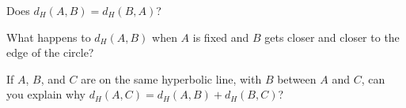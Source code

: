 \begin{prob}
Does $d_H(A,B) = d_H(B,A)$?
\end{prob}

\begin{prob}
What happens to $d_H(A,B)$ when $A$ is fixed and $B$ gets closer and
closer to the edge of the circle?
\end{prob}

\begin{prob}
If $A$, $B$, and $C$ are on the same hyperbolic line, with $B$ between
$A$ and $C$, can you explain why $d_H(A,C) = d_H(A,B)+ d_H(B,C)$?
\end{prob}

